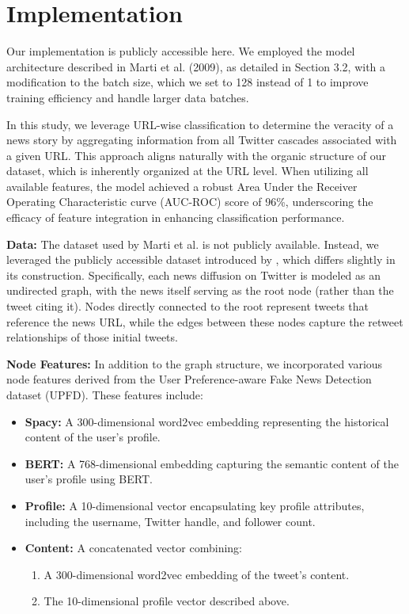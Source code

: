 \documentclass[sigconf,nonacm]{acmart}
\begin{document}
\section{Implementation}

Our implementation is publicly accessible here. We employed the model architecture described in Marti et al. (2009), as detailed in Section 3.2, with a modification to the batch size, which we set to 128 instead of 1 to improve training efficiency and handle larger data batches.

In this study, we leverage URL-wise classification to determine the veracity of a news story by aggregating information from all Twitter cascades associated with a given URL. This approach aligns naturally with the organic structure of our dataset, which is inherently organized at the URL level. When utilizing all available features, the model achieved a robust Area Under the Receiver Operating Characteristic curve (AUC-ROC) score of 96\%, underscoring the efficacy of feature integration in enhancing classification performance.

\textbf{Data:} The dataset used by Marti et al. is not publicly available. Instead, we leveraged the publicly accessible dataset introduced by \cite{10.1145/3404835.3462990}, which differs slightly in its construction. Specifically, each news diffusion on Twitter is modeled as an undirected graph, with the news itself serving as the root node (rather than the tweet citing it). Nodes directly connected to the root represent tweets that reference the news URL, while the edges between these nodes capture the retweet relationships of those initial tweets.

\textbf{Node Features:} In addition to the graph structure, we incorporated various node features derived from the User Preference-aware Fake News Detection dataset (UPFD). These features include:
\begin{itemize}
    \item \textbf{Spacy:} A 300-dimensional word2vec embedding representing the historical content of the user's profile.
    \item \textbf{BERT:} A 768-dimensional embedding capturing the semantic content of the user’s profile using BERT.
    \item \textbf{Profile:} A 10-dimensional vector encapsulating key profile attributes, including the username, Twitter handle, and follower count.
    \item \textbf{Content:} A concatenated vector combining:
    \begin{enumerate}
        \item A 300-dimensional word2vec embedding of the tweet's content.
        \item The 10-dimensional profile vector described above.
    \end{enumerate}
\end{itemize}
\end{document}
